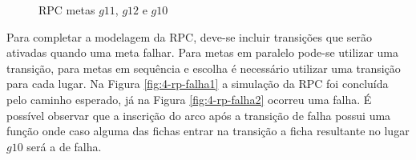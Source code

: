 \begin{figure}[ht]
  \centering
  \caption{RPC metas $g11$, $g12$ e $g10$}
  \label{fig:RPC-2}
\end{figure}

Para completar a modelagem da RPC, deve-se incluir transições que serão ativadas quando uma meta falhar. Para metas em paralelo pode-se utilizar uma transição, para metas em sequência e escolha é necessário utilizar uma transição para cada lugar. Na Figura \ref{fig:4-rp-falha1} a simulação da RPC foi concluída pelo caminho esperado, já na Figura \ref{fig:4-rp-falha2} ocorreu uma falha. É possível observar que a inscrição do arco após a transição de falha possui uma função onde caso alguma das fichas entrar na transição a ficha resultante no lugar $g10$ será a de falha.

